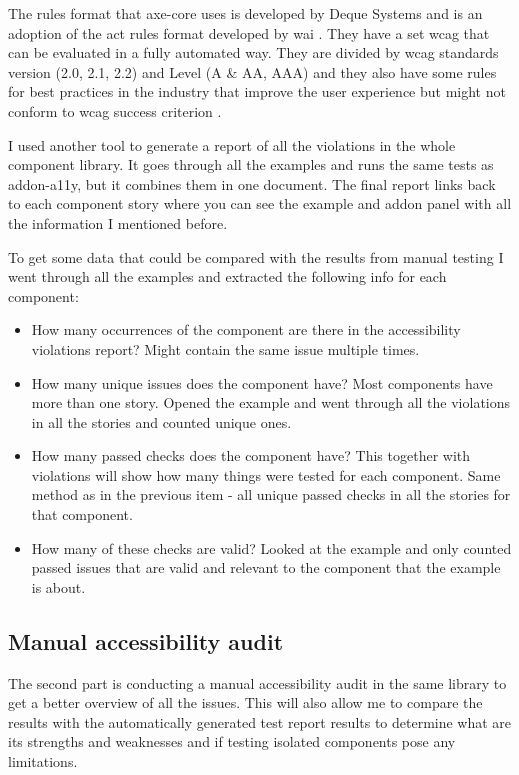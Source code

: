 \documentclass{master_thesis}
\begin{document}
The rules format that axe-core uses is developed by Deque Systems and is an adoption of the \ac{act} rules format developed by \ac{wai} \citep{Fiers2017}. They have a set \ac{wcag} that can be evaluated in a fully automated way. They are divided by \ac{wcag} standards version (2.0, 2.1, 2.2) and Level (A \& AA, AAA) and they also have some rules for best practices in the industry that improve the user experience but might not conform to \ac{wcag} success criterion \citep{Fiers2023}.

I used another tool to generate a report of all the violations in the whole component library. It goes through all the examples and runs the same tests as addon-a11y, but it combines them in one document. The final report links back to each component story where you can see the example and addon panel with all the information I mentioned before.

To get some data that could be compared with the results from manual testing I went through all the examples and extracted the following info for each component:

\begin{itemize}
	\item How many occurrences of the component are there in the accessibility violations report?  Might contain the same issue multiple times.
	\item How many unique issues does the component have? Most components have more than one story. Opened the example and went through all the violations in all the stories and counted unique ones.
	\item How many passed checks does the component have? This together with violations will show how many things were tested for each component. Same method as in the previous item - all unique passed checks in all the stories for that component.
	\item How many of these checks are valid? Looked at the example and only counted passed issues that are valid and relevant to the component that the example is about.
\end{itemize}

\subsection{Manual accessibility audit}

The second part is conducting a manual accessibility audit in the same library to get a better overview of all the issues. This will also allow me to compare the results with the automatically generated test report results to determine what are its strengths and weaknesses and if testing isolated components pose any limitations.
\end{document}
